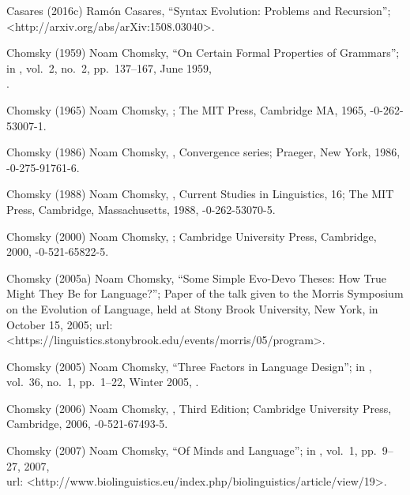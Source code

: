  Casares (2016c)
Ram\'on Casares,
``Syntax Evolution: Problems and Recursion'';\\
<http://arxiv.org/abs/arXiv:1508.03040>.

 Chomsky (1959)
Noam Chomsky,
``On Certain Formal Properties of Grammars'';\\
in ,
vol.\ 2, no.\ 2, pp.\ 137--167, June 1959,\\
.

 Chomsky (1965)
Noam Chomsky,
;
The MIT Press, Cambridge MA, 1965,
-0-262-53007-1.

 Chomsky (1986)
Noam Chomsky,
,
Convergence series;
Praeger, New York, 1986,
-0-275-91761-6.

 Chomsky (1988)
Noam Chomsky,
,
Current Studies in Linguistics, 16;
The MIT Press,
Cambridge, Massachu\-setts, 1988,
-0-262-53070-5.

 Chomsky (2000)
Noam Chomsky,
;
Cambridge University Press, Cambridge, 2000,
-0-521-65822-5.

 Chomsky (2005a)
Noam Chomsky,
``Some Simple Evo-Devo Theses:
 How True Might They Be for Language?'';
Paper of the talk given to the
Morris Symposium on the Evolution of Language,
held at Stony Brook University, New York,
in October 15, 2005;
{\sc url:}
\URL<https://linguistics.stonybrook.edu/events/morris/05/program>.

 Chomsky (2005)
Noam Chomsky,
``Three Factors in Language Design'';
in ,
vol.\ 36, no.\ 1, pp.\ 1--22, Winter 2005,
.

 Chomsky (2006)
Noam Chomsky,
, Third Edition;
Cambridge University Press, Cambridge, 2006,
-0-521-67493-5.

 Chomsky (2007)
Noam Chomsky,
``Of Minds and Language'';
in ,
vol.\ 1, pp.\ 9--27, 2007,\\
{\sc url:}
\URL<http://www.biolinguistics.eu/index.php/biolinguistics/article/view/19>.


